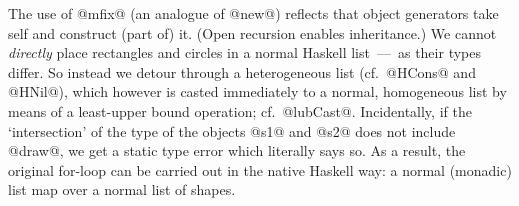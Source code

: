 The use of @mfix@ (an analogue of @new@) reflects that object
generators take self and construct (part of) it. (Open recursion
enables inheritance.) We cannot \emph{directly} place rectangles and
circles in a normal Haskell list~---~as their types differ. So instead
we detour through a heterogeneous list (cf.\ @HCons@ and @HNil@), which
however is casted immediately to a normal, homogeneous list by means
of a least-upper bound operation; cf.\ @lubCast@. Incidentally, if the
`intersection' of the type of the objects @s1@ and @s2@ does not
include @draw@, we get a static type error which literally says so. As
a result, the original for-loop can be carried out in the native
Haskell way: a normal (monadic) list map over a normal list of shapes.
